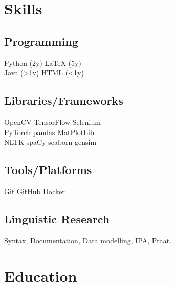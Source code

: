 \documentclass[]{plushcv}
\begin{document}
\hfill
\begin{minipage}[t]{0.25\textwidth} 


\section{Skills}
\subsection{Programming}
\sectionsep
{} 
Python (2y) \textbullet{} LaTeX (5y) \\
\sectionsep
{}
Java (>1y) \textbullet{}  HTML (<1y) \\
\sectionsep
\subsection{Libraries/Frameworks}
\sectionsep
OpenCV \textbullet{} TensorFlow \textbullet{} Selenium\\
PyTorch \textbullet{} pandas \textbullet{} MatPlotLib \\
NLTK \textbullet{} spaCy \textbullet{} seaborn \textbullet{} gensim 
\sectionsep
\subsection{Tools/Platforms}
\sectionsep
Git \textbullet{} GitHub \textbullet{} Docker \\
\sectionsep
\subsection{Linguistic Research}
\sectionsep
Syntax, Documentation, Data modelling, IPA, Praat.
\sectionsep


\section{Education} 



\end{minipage}
\end{document}
